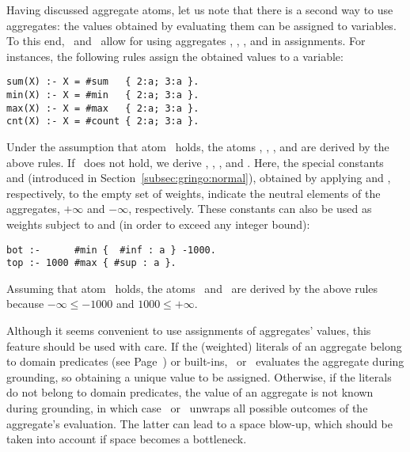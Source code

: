 Having discussed aggregate atoms,
let us note that there is a second way to use aggregates:
the values obtained by evaluating them can be assigned to variables.
To this end, \gringo\ and \clingo\ allow for using aggregates
, , , and  in assignments.
%
%
For instances, the following rules assign the obtained values to a variable:
\begin{lstlisting}[numbers=none]
sum(X) :- X = #sum   { 2:a; 3:a }.
min(X) :- X = #min   { 2:a; 3:a }.
max(X) :- X = #max   { 2:a; 3:a }.
cnt(X) :- X = #count { 2:a; 3:a }.
\end{lstlisting}
Under the assumption that atom~ holds,
the atoms , ,
, and  are
derived by the above rules.
If~ does not hold, we derive 
, ,
, and .
Here, the special constants  and 
(introduced in Section~\ref{subsec:gringo:normal}),
obtained by applying  and , respectively,
to the empty set of weights,
indicate the neutral elements of the aggregates,
$+\infty$ and $-\infty$, respectively.
These constants can also be used as weights subject to 
 and  (in order to exceed any integer bound):
\begin{lstlisting}[numbers=none]
bot :-      #min {  #inf : a } -1000.
top :- 1000 #max { #sup : a }.
\end{lstlisting}
Assuming that atom~ holds,
the atoms~ and~ are derived by the above rules
because $-\infty\leq-1000$ and $1000\leq+\infty$.

Although it seems convenient to use assignments of aggregates' values,
this feature should be used with care.
If the (weighted) literals of an aggregate belong to domain predicates
(see Page~\pageref{pg:domain}) or built-ins,
\gringo\ or \clingo\ evaluates the aggregate during grounding, so obtaining
a unique value to be assigned.
%
%
Otherwise, if the literals do not belong to domain predicates,
the value of an aggregate is not known during grounding,
in which case \gringo\ or \clingo\ unwraps all possible outcomes of the
aggregate's evaluation.
The latter can lead to a space blow-up, which should be taken into account
if space becomes a bottleneck.

